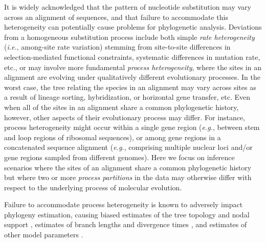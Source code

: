 \documentclass[11pt]{article}
\begin{document}
\noindent
It is widely acknowledged that the pattern of nucleotide substitution may vary across an alignment of sequences, and that failure to accommodate this heterogeneity can potentially cause problems for phylogenetic analysis.
Deviations from a homogeneous substitution process include both simple {\it rate heterogeneity} ({\it i.e.}, among-site rate variation) stemming from site-to-site differences in selection-mediated functional constraints, systematic differences in mutation rate, etc., or may involve more fundamental {\it process heterogeneity}, where the sites in an alignment are evolving under qualitatively different evolutionary processes.  
In the worst case, the tree relating the species in an alignment may vary across sites as a result of lineage sorting, hybridization, or horizontal gene transfer, etc.
Even when all of the sites in an alignment share a common phylogenetic history, however, other aspects of their evolutionary 
process may differ.
For instance, process heterogeneity might occur within a single gene region ({\it e.g.}, between stem and loop regions of ribosomal sequences), or among gene regions in a concatenated sequence alignment ({\it e.g.}, comprising multiple nuclear loci and/or gene regions sampled from different genomes).  
Here we focus on inference scenarios where the sites of an alignment share a common phylogenetic history but where two or more {\it process partitions} in the data  \citep[{\it sensu} ][]{bull93} may otherwise differ with respect to the underlying process of molecular evolution.

Failure to accommodate process heterogeneity is known to adversely impact phylogeny estimation, causing biased estimates of the tree topology and nodal support \citep{brandley05,brown07}, estimates of branch lengths and divergence times \citep{marshall06,poux08,vendetti08}, and estimates of other model parameters \citep{nylander04,pagel04}.
 
\end{document}
